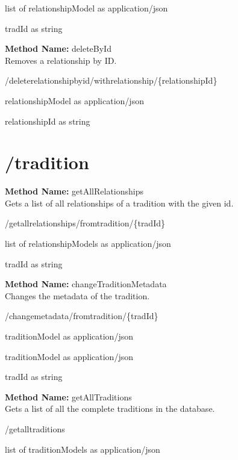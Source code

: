 \begin{response}
list of relationshipModel as application/json
\end{response}
\begin{parameter}
tradId as string
\end{parameter}
\textbf{Method Name: }deleteById \\ Removes a relationship by ID.
\begin{delete}
/deleterelationshipbyid/withrelationship/\{relationshipId\}
\end{delete}
\begin{response}
relationshipModel as application/json
\end{response}
\begin{parameter}
relationshipId as string
\end{parameter}
\section{/tradition}
\textbf{Method Name: }getAllRelationships \\ Gets a list of all relationships of a tradition with the given id.
\begin{get}
/getallrelationships/fromtradition/\{tradId\}
\end{get}
\begin{response}
list of relationshipModels as application/json
\end{response}
\begin{parameter}
tradId as string
\end{parameter}
\textbf{Method Name: }changeTraditionMetadata \\ Changes the metadata of the tradition.
\begin{post}
/changemetadata/fromtradition/\{tradId\}
\end{post}
\begin{request}
traditionModel as application/json
\end{request}
\begin{response}
traditionModel as application/json
\end{response}
\begin{parameter}
tradId as string
\end{parameter}
\textbf{Method Name: }getAllTraditions \\ Gets a list of all the complete traditions in the database.
\begin{get}
/getalltraditions
\end{get}
\begin{response}
list of traditionModels as application/json
\end{response}
